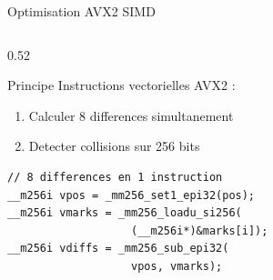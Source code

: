 \documentclass[aspectratio=169,9pt]{beamer}
\begin{document}
\begin{frame}[fragile,shrink=5]{Optimisation AVX2 SIMD}
    \begin{columns}[T]
        \begin{column}{0.52\textwidth}
            \begin{block}{Principe}
                Instructions vectorielles AVX2 :
                \begin{enumerate}\small
                    \item Calculer 8 differences simultanement
                    \item Detecter collisions sur 256 bits
                \end{enumerate}
            \end{block}
            \vspace{0.1cm}
\begin{lstlisting}
// 8 differences en 1 instruction
__m256i vpos = _mm256_set1_epi32(pos);
__m256i vmarks = _mm256_loadu_si256(
                   (__m256i*)&marks[i]);
__m256i vdiffs = _mm256_sub_epi32(
                   vpos, vmarks);


\end{lstlisting}
\end{column}
\end{columns}
\end{frame}
\end{document}
